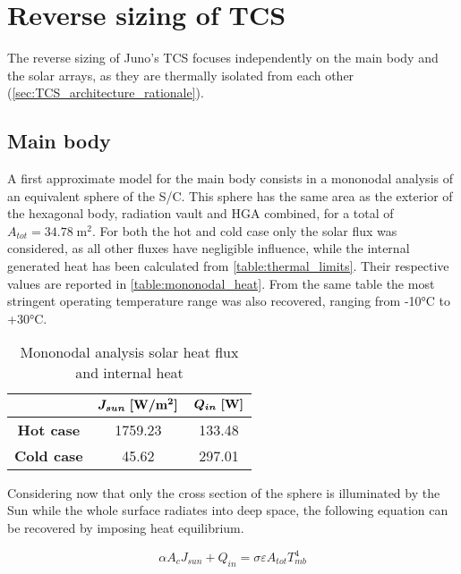 \section{Reverse sizing of TCS}
\label{sec:TCS_sizing}

The reverse sizing of Juno's TCS focuses independently on the main body and the solar arrays, as they are thermally isolated from each other (\autoref{sec:TCS_architecture_rationale}). 

\subsection{Main body}
\label{subsec:mb_mono_sizing}

A first approximate model for the main body consists in a mononodal analysis of an equivalent sphere of the S/C. This sphere has the same area as the exterior of the hexagonal body, radiation vault and HGA combined, for a total of $A_{tot} = 34.78 \; \textrm{m}^2$. For both the hot and cold case only the solar flux was considered, as all other fluxes have negligible influence, while the internal generated heat has been calculated from \autoref{table:thermal_limits}. Their respective values are reported in \autoref{table:mononodal_heat}. From the same table the most stringent operating temperature range was also recovered, ranging from -10°C to +30°C. 
\begin{table}[H]
    \renewcommand{\arraystretch}{1.3}
    \centering
    \begin{tabular}{|c|c|c|}
        \hline
        & $\boldsymbol{J_{sun} \; [\textrm{\textbf{W}}/\textrm{\textbf{m}}^2]}$ & $\boldsymbol{Q_{in} \; [\textrm{\textbf{W}}]}$ \\
        \hline
        \hline
        \textbf{Hot case} & 1759.23 & 133.48 \\
        \hline
        \textbf{Cold case} & 45.62 & 297.01 \\ 
        \hline
    \end{tabular}
    \caption{Mononodal analysis solar heat flux and internal heat}
    \label{table:mononodal_heat}
\end{table}

Considering now that only the cross section of the sphere is illuminated by the Sun while the whole surface radiates into deep space, the following equation can be recovered by imposing heat equilibrium.

\begin{equation}
    \alpha A_c J_{sun} + Q_{in} = \sigma \varepsilon A_{tot} T_{mb}^4
    \label{eq:heat_equlibrium}
\end{equation}  

